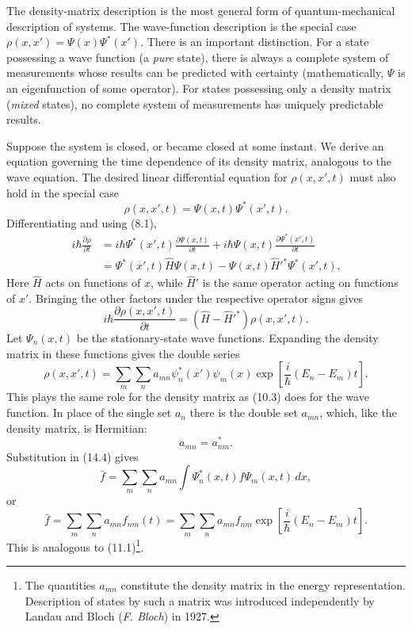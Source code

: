 The density-matrix description is the most general form of
quantum-mechanical description of systems. The wave-function description is the special
case $\rho(x,x')=\Psi(x)\Psi^*(x')$. There is an important distinction. For a
state possessing a wave function (a \textit{pure} state), there is always a
complete system of measurements whose results can be predicted with certainty
(mathematically, $\Psi$ is an eigenfunction of some operator). For states
possessing only a density matrix (\textit{mixed} states), no complete system
of measurements has uniquely predictable results.

Suppose the system is closed, or became closed at some instant. We derive an
equation governing the time dependence of its density matrix, analogous to the
wave equation. The desired linear differential equation for $\rho(x,x',t)$
must also hold in the special case
\[
 \rho(x,x',t)=\Psi(x,t)\Psi^*(x',t).
\]
Differentiating and using (8.1),
\[
 \begin{aligned}
 i\hbar\frac{\partial\rho}{\partial t}
 &=i\hbar\Psi^*(x',t)\frac{\partial\Psi(x,t)}{\partial t}
 +i\hbar\Psi(x,t)\frac{\partial\Psi^*(x',t)}{\partial t}\\
 &=\Psi^*(x',t)\hat H\Psi(x,t)
 -\Psi(x,t)\hat H'^*\Psi^*(x',t).
 \end{aligned}
\]
Here $\hat H$ acts on functions of $x$, while $\hat H'$ is the same operator
acting on functions of $x'$. Bringing the other factors under the respective
operator signs gives
\begin{equation}
 i\hbar\frac{\partial\rho(x,x',t)}{\partial t}
 =(\hat H-\hat H'^*)\rho(x,x',t).
 \tag{14.5}
\end{equation}
Let $\Psi_n(x,t)$ be the stationary-state wave functions. Expanding the density
matrix in these functions gives
the double series
\begin{equation}
 \rho(x,x',t)=\sum_m\sum_n a_{mn}\psi_n^*(x')\psi_m(x)
 \exp\left[\frac{i}{\hbar}(E_n-E_m)t\right].
 \tag{14.6}
\end{equation}
This plays the same role for the density matrix as (10.3) does for the wave
function. In place of the single set $a_n$ there is the double set $a_{mn}$,
which, like the density matrix, is Hermitian:
\begin{equation}
 a_{mn}=a_{nm}^*.
 \tag{14.7}
\end{equation}
Substitution in (14.4) gives
\[
 \bar f=\sum_m\sum_n a_{mn}\int\Psi_n^*(x,t)\hat f\Psi_m(x,t)\,dx,
\]
or
\begin{equation}
 \bar f=\sum_m\sum_n a_{mn}f_{nm}(t)
 =\sum_m\sum_n a_{mn}f_{nm}
 \exp\left[\frac{i}{\hbar}(E_n-E_m)t\right].
 \tag{14.8}
\end{equation}
This is analogous to (11.1)\footnote{The quantities $a_{mn}$ constitute the
density matrix in the energy representation. Description of states by such a
matrix was introduced independently by Landau and Bloch (\textit{F. Bloch}) in
1927.}.

